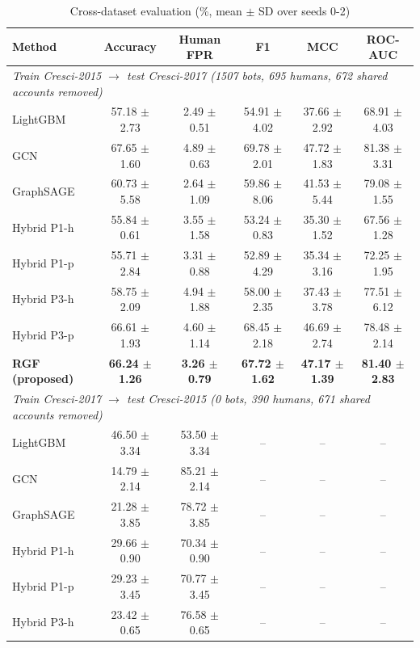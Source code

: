 \begin{table}[!t]
\centering
\caption{Cross-dataset evaluation (\%, mean $\pm$ SD over seeds 0-2)}
\label{tab:cross_dataset}
\footnotesize
\setlength{\tabcolsep}{3pt}
\begin{tabular}{lccccc}
\hline
\textbf{Method} & \textbf{Accuracy} & \textbf{Human FPR} & \textbf{F1} & \textbf{MCC} & \textbf{ROC-AUC} \\
\hline
\multicolumn{6}{l}{\textit{Train Cresci-2015 $\rightarrow$ test Cresci-2017 (1507 bots, 695 humans, 672 shared accounts removed)}} \\
LightGBM & 57.18 $\pm$ 2.73 & 2.49 $\pm$ 0.51 & 54.91 $\pm$ 4.02 & 37.66 $\pm$ 2.92 & 68.91 $\pm$ 4.03 \\
GCN & 67.65 $\pm$ 1.60 & 4.89 $\pm$ 0.63 & 69.78 $\pm$ 2.01 & 47.72 $\pm$ 1.83 & 81.38 $\pm$ 3.31 \\
GraphSAGE & 60.73 $\pm$ 5.58 & 2.64 $\pm$ 1.09 & 59.86 $\pm$ 8.06 & 41.53 $\pm$ 5.44 & 79.08 $\pm$ 1.55 \\
Hybrid P1-h & 55.84 $\pm$ 0.61 & 3.55 $\pm$ 1.58 & 53.24 $\pm$ 0.83 & 35.30 $\pm$ 1.52 & 67.56 $\pm$ 1.28 \\
Hybrid P1-p & 55.71 $\pm$ 2.84 & 3.31 $\pm$ 0.88 & 52.89 $\pm$ 4.29 & 35.34 $\pm$ 3.16 & 72.25 $\pm$ 1.95 \\
Hybrid P3-h & 58.75 $\pm$ 2.09 & 4.94 $\pm$ 1.88 & 58.00 $\pm$ 2.35 & 37.43 $\pm$ 3.78 & 77.51 $\pm$ 6.12 \\
Hybrid P3-p & 66.61 $\pm$ 1.93 & 4.60 $\pm$ 1.14 & 68.45 $\pm$ 2.18 & 46.69 $\pm$ 2.74 & 78.48 $\pm$ 2.14 \\
\textbf{RGF (proposed)} & \textbf{66.24 $\pm$ 1.26} & \textbf{3.26 $\pm$ 0.79} & \textbf{67.72 $\pm$ 1.62} & \textbf{47.17 $\pm$ 1.39} & \textbf{81.40 $\pm$ 2.83} \\
\multicolumn{6}{l}{\textit{Train Cresci-2017 $\rightarrow$ test Cresci-2015 (0 bots, 390 humans, 671 shared accounts removed)}} \\
LightGBM & 46.50 $\pm$ 3.34 & 53.50 $\pm$ 3.34 & -- & -- & -- \\
GCN & 14.79 $\pm$ 2.14 & 85.21 $\pm$ 2.14 & -- & -- & -- \\
GraphSAGE & 21.28 $\pm$ 3.85 & 78.72 $\pm$ 3.85 & -- & -- & -- \\
Hybrid P1-h & 29.66 $\pm$ 0.90 & 70.34 $\pm$ 0.90 & -- & -- & -- \\
Hybrid P1-p & 29.23 $\pm$ 3.45 & 70.77 $\pm$ 3.45 & -- & -- & -- \\
Hybrid P3-h & 23.42 $\pm$ 0.65 & 76.58 $\pm$ 0.65 & -- & -- & -- \\

\end{tabular}
\end{table}
